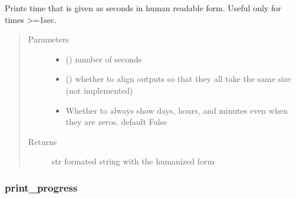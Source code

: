 \documentclass[a4paper,10pt,english]{sphinxmanual}
\begin{document}
\begin{fulllineitems}
\label{\detokenize{api/termtools.terminal.humanize_time:termtools.terminal.humanize_time}}
Prints time that is given as seconds in human readable form. Useful only for times \textgreater{}=1sec.
\begin{quote}\begin{description}
\item[{Parameters}] \leavevmode\begin{itemize}
\item {} 
 () \textendash{} number of seconds

\item {} 
\sphinxstyleliteralstrong{, } () \textendash{} whether to align outputs so that they all take the same size (not implemented)

\item {} 
\sphinxstyleliteralstrong{, } \textendash{} Whether to always show days, hours, and minutes even when they
are zeros. default False

\end{itemize}

\item[{Returns}] \leavevmode
str formated string with the humanized form

\end{description}\end{quote}

\end{fulllineitems}



\subsubsection{print\_progress}
\label{\detokenize{api/termtools.terminal.print_progress::doc}}\label{\detokenize{api/termtools.terminal.print_progress:print-progress}}
\end{document}
